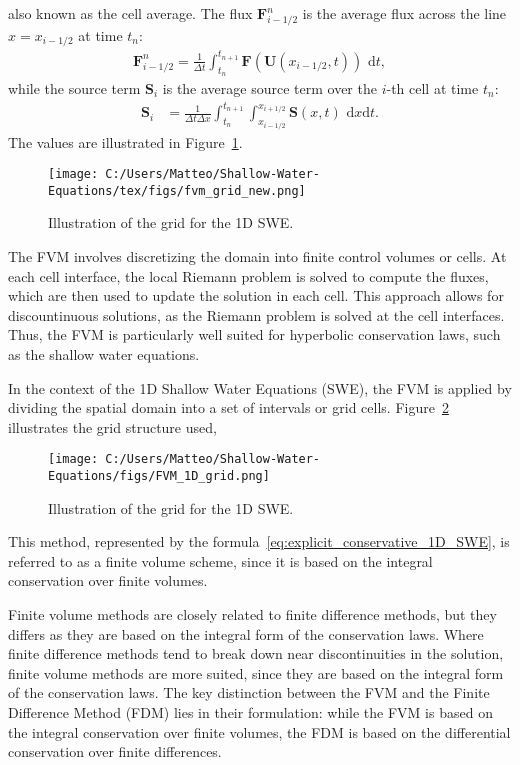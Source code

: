 also known as the cell average.
The flux $\mathbf{F}_{i-1/2}^n$ is the average flux across the line $x = x_{i-1/2}$ at time $t_n$:
\begin{align*}
    \mathbf{F}_{i-1/2}^n = \frac{1}{\Delta t} \int_{t_n}^{t_{n+1}} \mathbf{F}(\mathbf{U}(x_{i-1/2},t)) \text{ d}t,
\end{align*}
while the source term $\mathbf{S}_i$ is the average source term over the $i$-th cell at time $t_n$:
\begin{align*}
    \mathbf{S}_i &= \frac{1}{\Delta t \Delta x} \int_{t_n}^{t_{n+1}} \int_{x_{i-1/2}}^{x_{i+1/2}} \mathbf{S}(x,t) \text{ d}x\text{d}t.
\end{align*}
The values are illustrated in Figure~\ref{fig:10_3}.
\begin{figure}[H]
    \centering
    \texttt{[image: C:/Users/Matteo/Shallow-Water-Equations/tex/figs/fvm\_grid\_new.png]}
    \caption{Illustration of the grid for the 1D SWE.}\label{fig:10_3}
\end{figure}
The FVM involves discretizing the domain into finite control volumes or cells.
At each cell interface, the local Riemann problem is solved to compute the fluxes, which are then used to update the solution in each cell.
This approach allows for discountinuous solutions, as the Riemann problem is solved at the cell interfaces.
Thus, the FVM is particularly well suited for hyperbolic conservation laws, such as the shallow water equations.

In the context of the 1D Shallow Water Equations (SWE), the FVM is applied by dividing the spatial domain into a set of intervals or grid cells.
Figure~\ref{fig:FVM_1D_grid} illustrates the grid structure used,
\begin{figure}[H]
    \centering
    \texttt{[image: C:/Users/Matteo/Shallow-Water-Equations/figs/FVM\_1D\_grid.png]}
    \caption{Illustration of the grid for the 1D SWE.}\label{fig:FVM_1D_grid}
\end{figure}

This method, represented by the formula~\eqref{eq:explicit_conservative_1D_SWE}, is referred to as a finite volume scheme, since it is based on the integral conservation over finite volumes.

Finite volume methods are closely related to finite difference methods, but they differs as they are based on the integral form of the conservation laws.
Where finite difference methods tend to break down near discontinuities in the solution, finite volume methods are more suited, since they are based on the integral form of the conservation laws.
The key distinction between the FVM and the Finite Difference Method (FDM) lies in their formulation: while the FVM is based on the integral conservation over finite volumes, the FDM is based on the differential conservation over finite differences.

